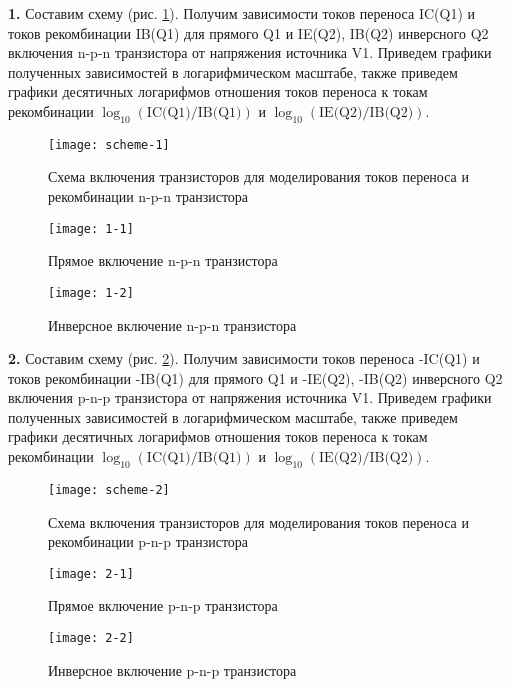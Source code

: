 \documentclass{semi}
\begin{document}
\textbf{{\normalsize 1.}}
Составим схему (рис. \ref{scheme-1}). Получим зависимости токов переноса IC(Q1) и токов рекомбинации IB(Q1) для прямого Q1 и IE(Q2), IB(Q2) инверсного Q2 включения n-p-n транзистора от напряжения источника V1. Приведем графики полученных зависимостей в логарифмическом масштабе, также приведем графики десятичных логарифмов отношения токов переноса к токам рекомбинации $ \log_{10} ( \text{IC(Q1)} / \text{IB(Q1)} ) $ и $ \log_{10} ( \text{IE(Q2)} / \text{IB(Q2)} ) $.

\begin{figure}[H]
	\centering
	\texttt{[image: scheme-1]}
	\caption{Схема включения транзисторов для моделирования токов переноса и рекомбинации n-p-n транзистора}
	\label{scheme-1}
\end{figure}

\begin{figure}[H]
	\centering
	\texttt{[image: 1-1]}
	\caption{Прямое включение n-p-n транзистора}
\end{figure}

\begin{figure}[H]
	\centering
	\texttt{[image: 1-2]}
	\caption{Инверсное включение n-p-n транзистора}
\end{figure}

\textbf{{\normalsize 2.}}
Составим схему (рис. \ref{scheme-2}). Получим зависимости токов переноса -IC(Q1) и токов рекомбинации -IB(Q1) для прямого Q1 и -IE(Q2), -IB(Q2) инверсного Q2 включения p-n-p транзистора от напряжения источника V1. Приведем графики полученных зависимостей в логарифмическом масштабе, также приведем графики десятичных логарифмов отношения токов переноса к токам рекомбинации $ \log_{10} ( \text{IC(Q1)} / \text{IB(Q1)} ) $ и $ \log_{10} ( \text{IE(Q2)} / \text{IB(Q2)} ) $.

\begin{figure}[H]
	\centering
	\texttt{[image: scheme-2]}
	\caption{Схема включения транзисторов для моделирования токов переноса и рекомбинации p-n-p транзистора}
	\label{scheme-2}
\end{figure}

\begin{figure}[H]
	\centering
	\texttt{[image: 2-1]}
	\caption{Прямое включение p-n-p транзистора}
\end{figure}

\begin{figure}[H]
	\centering
	\texttt{[image: 2-2]}
	\caption{Инверсное включение p-n-p транзистора}
\end{figure}
\end{document}
